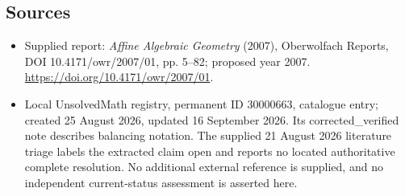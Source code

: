 \documentclass[11pt]{article}
\begin{document}
\subsection{Sources}
\begin{itemize}
\item Supplied report: \emph{Affine Algebraic Geometry} (2007), Oberwolfach Reports, DOI 10.4171/owr/2007/01, pp. 5--82; proposed year 2007. \url{https://doi.org/10.4171/owr/2007/01}.
\item Local UnsolvedMath registry, permanent ID 30000663, catalogue entry; created 25 August 2026, updated 16 September 2026. Its corrected\_verified note describes balancing notation. The supplied 21 August 2026 literature triage labels the extracted claim open and reports no located authoritative complete resolution. No additional external reference is supplied, and no independent current-status assessment is asserted here.
\end{itemize}
\end{document}
